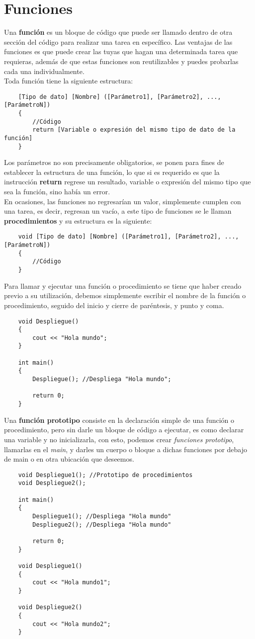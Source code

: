 \section{Funciones}
Una \textbf{función} es un bloque de código que puede ser llamado dentro de otra sección del código para realizar una tarea en específico. Las ventajas de las funciones es que puede crear las tuyas que hagan una determinada tarea que requieras, además de que estas funciones son reutilizables y puedes probarlas cada una individualmente.\\
Toda función tiene la siguiente estructura:
\begin{lstlisting}
    [Tipo de dato] [Nombre] ([Parámetro1], [Parámetro2], ..., [ParámetroN])
    {
        //Código
        return [Variable o expresión del mismo tipo de dato de la función]
    }
\end{lstlisting}
Los parámetros no son precisamente obligatorios, se ponen para fines de establecer la estructura de una función, lo que si es requerido es que la instrucción \textbf{return} regrese un resultado, variable o expresión del mismo tipo que sea la función, sino había un error.\\
En ocasiones, las funciones no regresarían un valor, simplemente cumplen con una tarea, es decir, regresan un vacío, a este tipo de funciones se le llaman \textbf{procedimientos} y su estructura es la siguiente:
\begin{lstlisting}
    void [Tipo de dato] [Nombre] ([Parámetro1], [Parámetro2], ..., [ParámetroN])
    {
        //Código
    }
\end{lstlisting}
Para llamar y ejecutar una función o procedimiento se tiene que haber creado previo a su utilización, debemos simplemente escribir el nombre de la función o procedimiento, seguido del inicio y cierre de paréntesis, y punto y coma.
\begin{lstlisting}
    void Despliegue()
    {
        cout << "Hola mundo";
    }
    
    int main()
    {
        Despliegue(); //Despliega "Hola mundo";
        
        return 0;
    }
\end{lstlisting}
Una \textbf{función prototipo} consiste en la declaración simple de una función o procedimiento, pero sin darle un bloque de código a ejecutar, es como declarar una variable y no inicializarla, con esto, podemos crear \textit{funciones prototipo}, llamarlas en el \textit{main}, y darles un cuerpo o bloque a dichas funciones por debajo de main o en otra ubicación que deseemos.
\begin{lstlisting}
    void Despliegue1(); //Prototipo de procedimientos
    void Despliegue2();
    
    int main()
    {
        Despliegue1(); //Despliega "Hola mundo"
        Despliegue2(); //Despliega "Hola mundo"
        
        return 0;
    }
    
    void Despliegue1()
    {
        cout << "Hola mundo1";
    }
    
    void Despliegue2()
    {
        cout << "Hola mundo2";
    }
\end{lstlisting}

